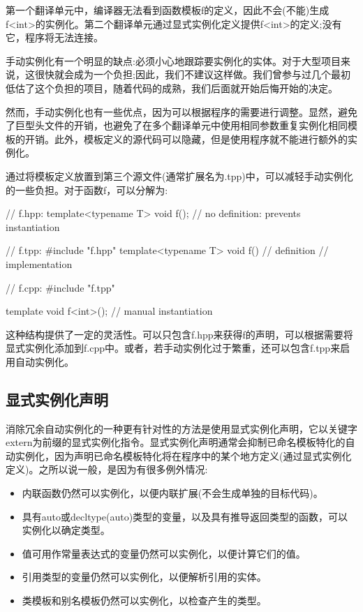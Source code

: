 第一个翻译单元中，编译器无法看到函数模板f的定义，因此不会(不能)生成f<int>的实例化。第二个翻译单元通过显式实例化定义提供f<int>的定义;没有它，程序将无法连接。

手动实例化有一个明显的缺点:必须小心地跟踪要实例化的实体。对于大型项目来说，这很快就会成为一个负担;因此，我们不建议这样做。我们曾参与过几个最初低估了这个负担的项目，随着代码的成熟，我们后面就开始后悔开始的决定。

然而，手动实例化也有一些优点，因为可以根据程序的需要进行调整。显然，避免了巨型头文件的开销，也避免了在多个翻译单元中使用相同参数重复实例化相同模板的开销。此外，模板定义的源代码可以隐藏，但是使用程序就不能进行额外的实例化。

通过将模板定义放置到第三个源文件(通常扩展名为.tpp)中，可以减轻手动实例化的一些负担。对于函数f，可以分解为:

\begin{cpp}
// f.hpp:
template<typename T> void f(); // no definition: prevents instantiation

// f.tpp:
#include "f.hpp"
template<typename T> void f() // definition
{
	// implementation
}

// f.cpp:
#include "f.tpp"

template void f<int>(); // manual instantiation
\end{cpp}

这种结构提供了一定的灵活性。可以只包含f.hpp来获得f的声明，可以根据需要将显式实例化添加到f.cpp中。或者，若手动实例化过于繁重，还可以包含f.tpp来启用自动实例化。

\subsection{显式实例化声明}

消除冗余自动实例化的一种更有针对性的方法是使用显式实例化声明，它以关键字extern为前缀的显式实例化指令。显式实例化声明通常会抑制已命名模板特化的自动实例化，因为声明已命名模板特化将在程序中的某个地方定义(通过显式实例化定义)。之所以说一般，是因为有很多例外情况:

\begin{itemize}
\item 
内联函数仍然可以实例化，以便内联扩展(不会生成单独的目标代码)。

\item 
具有auto或decltype(auto)类型的变量，以及具有推导返回类型的函数，可以实例化以确定类型。

\item 
值可用作常量表达式的变量仍然可以实例化，以便计算它们的值。

\item 
引用类型的变量仍然可以实例化，以便解析引用的实体。

\item 
类模板和别名模板仍然可以实例化，以检查产生的类型。
\end{itemize}

